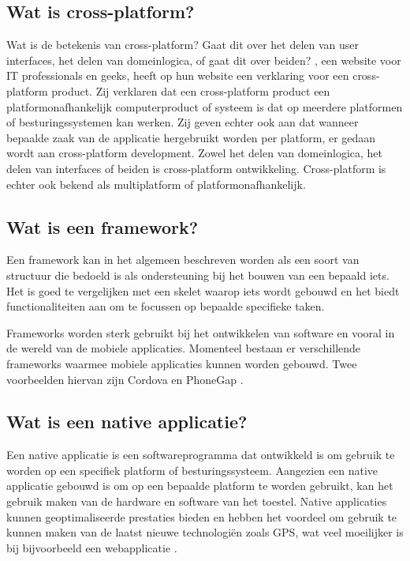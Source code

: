  \subsection{Wat is cross-platform?}
 Wat is de betekenis van cross-platform? Gaat dit over het delen van user interfaces, het delen van domeinlogica, of gaat dit over beiden? \textcite{CrossExplain}, een website voor IT professionals en geeks, heeft op hun website een verklaring voor een cross-platform product. Zij verklaren dat een cross-platform product een platformonafhankelijk computerproduct of systeem is dat op meerdere platformen of besturingssystemen kan werken. Zij geven echter ook aan dat wanneer bepaalde zaak van de applicatie hergebruikt worden per platform, er gedaan wordt aan cross-platform development. Zowel het delen van domeinlogica, het delen van interfaces of beiden is cross-platform ontwikkeling. Cross-platform is echter ook bekend als multiplatform of platformonafhankelijk.
 
\subsection{Wat is een framework?}
Een framework kan in het algemeen beschreven worden als een soort van structuur die bedoeld is als ondersteuning bij het bouwen van een bepaald iets. Het is goed te vergelijken met een skelet waarop iets wordt gebouwd en het biedt functionaliteiten aan om te focussen op bepaalde specifieke taken. 

Frameworks worden sterk gebruikt bij het ontwikkelen van software en vooral in de wereld van de mobiele applicaties. Momenteel bestaan er verschillende frameworks waarmee mobiele applicaties kunnen worden gebouwd. Twee voorbeelden hiervan zijn Cordova en PhoneGap \autocite{Framework}.

\subsection{Wat is een native applicatie?}
Een native applicatie is een softwareprogramma dat ontwikkeld is om gebruik te worden op een specifiek platform of besturingssysteem. Aangezien een native applicatie gebouwd is om op een bepaalde platform te worden gebruikt, kan het gebruik maken van de hardware en software van het toestel. Native applicaties kunnen geoptimaliseerde prestaties bieden en hebben het voordeel om gebruik te kunnen maken van de laatst nieuwe technologiën zoals GPS, wat veel moeilijker is bij bijvoorbeeld een webapplicatie \autocite{MeaningNativeApp}.

